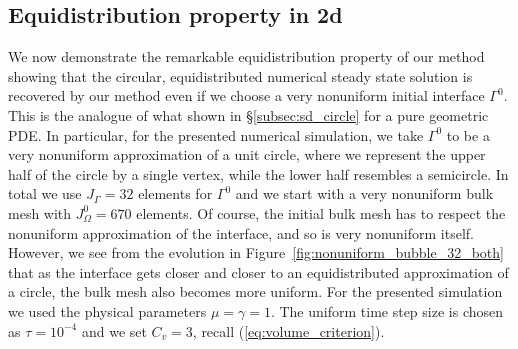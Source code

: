 \subsection{Equidistribution property in 2d}
We now demonstrate the remarkable equidistribution property of our method
showing that the circular, equidistributed numerical steady state solution is
recovered by our method even if we choose a very nonuniform initial interface
$\Gamma^0$. This is the analogue of what shown in \S\ref{subsec:sd_circle}
for a pure geometric PDE. In particular, for the presented numerical
simulation, we take $\Gamma^0$ to be a very nonuniform approximation of a unit
circle, where we represent the upper half of the circle by a single vertex,
while the lower half resembles a semicircle. In total we use $J_\Gamma = 32$
elements for $\Gamma^0$ and we start with a very nonuniform bulk mesh with
$J_\Omega^0 = 670$ elements. Of course, the initial bulk mesh has to respect
the nonuniform approximation of the interface, and so is very nonuniform
itself. However, we see from the evolution in
Figure~\ref{fig:nonuniform_bubble_32_both} that as the interface gets closer
and closer to an equidistributed approximation of a circle, the bulk mesh also
becomes more uniform. For the presented simulation we used the physical
parameters $\mu= \gamma=1$. The uniform time step size is chosen as
$\tau=10^{-4}$ and we set $C_v=3$, recall (\ref{eq:volume_criterion}).
